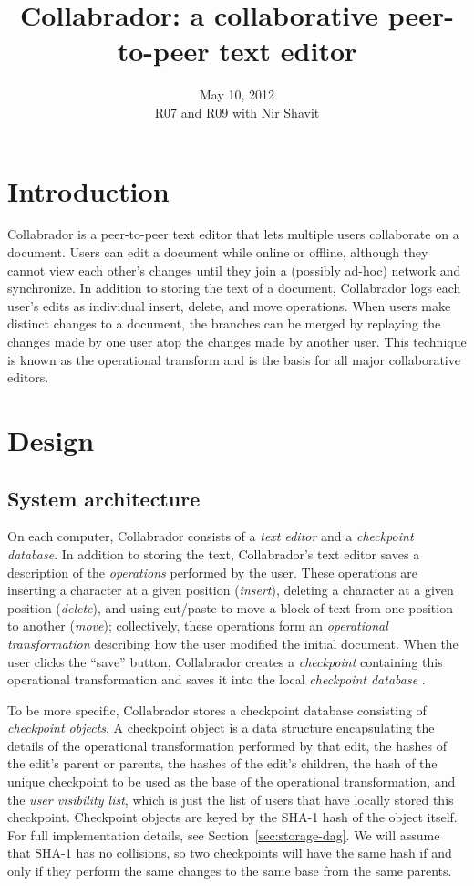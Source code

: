 \documentclass[11pt,titlepage]{article}
\title{Collabrador: a collaborative peer-to-peer text editor}
\author{
  \name{Jacob Hurwitz}{jhurwitz@mit.edu}
  \name{Colleen Josephson}{cjoseph@mit.edu}
  \name{David Lawrence}{dlaw@mit.edu}}
\date{
  May 10, 2012 \\ \small
  R07 and R09 with Nir Shavit}
\begin{document}
\maketitle

\section{Introduction}

Collabrador is a peer-to-peer text editor that lets multiple users
collaborate on a document. Users can edit a document while online or
offline, although they cannot view each other's changes until they
join a (possibly ad-hoc) network and synchronize.  In addition to
storing the text of a document, Collabrador logs each user's edits as
individual insert, delete, and move operations.  When users make
distinct changes to a document, the branches can be merged by
replaying the changes made by one user atop the changes made by
another user.  This technique is known as the operational transform
and is the basis for all major collaborative editors.

\section{Design}

\subsection{System architecture}

On each computer, Collabrador consists of a \emph{text editor} and a
\emph{checkpoint database}. In addition to storing the text,
Collabrador's text editor saves a description of the
\emph{operations} performed by the user. These operations are
inserting a character at a given position (\emph{insert}), deleting
a character at a given position (\emph{delete}), and using cut/paste
to move a block of text from one position to another (\emph{move});
collectively, these operations form an \emph{operational
  transformation} describing how the user modified the initial
document. When the user clicks the ``save'' button, Collabrador
creates a \emph{checkpoint} containing this operational
transformation and saves it into the local \emph{checkpoint
  database} \cite{ot}.

To be more specific, Collabrador stores a checkpoint database
consisting of \emph{checkpoint objects}. A checkpoint object is a data structure
encapsulating the details of the operational transformation performed
by that edit, the hashes of the edit's parent or parents, the hashes
of the edit's children, the hash of the unique checkpoint to be used
as the base of the operational transformation, and the \emph{user
  visibility list}, which is just the list of users that have locally
stored this checkpoint. Checkpoint objects are keyed by the SHA-1 hash of
the object itself. For full implementation details, see
Section~\ref{sec:storage-dag}.  We will assume that SHA-1 has no collisions,
so two checkpoints will have the same hash if and only if they perform
the same changes to the same base from the same parents.
\end{document}
